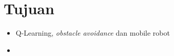 \section{Tujuan}
\begin{itemize}
	\item Q-Learning, \textit{obstacle avoidance} dan mobile robot
	\item 
\end{itemize}
   
    
    
    
